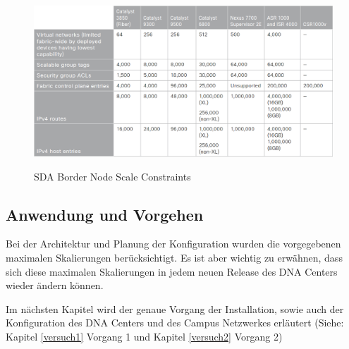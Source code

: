 \begin{figure}[H]
	\centering
	\includegraphics[width=1\linewidth]{img/MaximumScale-BorderNode.png}\\[1px]
	\caption{SDA Border Node Scale Constraints \cite{sda-designguide}}
	\label{fig:SDA Border Node Scale Constraints}
\end{figure}

\subsection{Anwendung und Vorgehen}
Bei der Architektur und Planung der Konfiguration wurden die vorgegebenen maximalen Skalierungen berücksichtigt. Es ist aber wichtig zu erwähnen, dass sich diese maximalen Skalierungen in jedem neuen Release des DNA Centers wieder ändern können.

Im nächsten Kapitel wird der genaue Vorgang der Installation, sowie auch der Konfiguration des DNA Centers und des Campus Netzwerkes erläutert (Siehe: Kapitel \ref{versuch1} Vorgang 1 und Kapitel \ref{versuch2} Vorgang 2)

